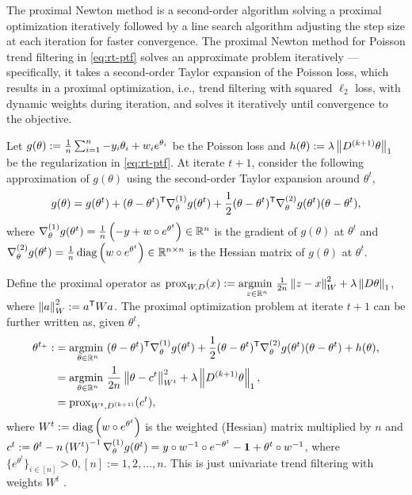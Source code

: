 The proximal Newton method is a second-order algorithm solving a proximal optimization iteratively followed by a line search algorithm adjusting the step size at each iteration for faster convergence. The proximal Newton method for Poisson trend filtering in \eqref{eq:rt-ptf} solves an approximate problem iteratively --- specifically, it takes a second-order Taylor expansion of the Poisson loss, which results in a proximal optimization, i.e., trend filtering with squared $\ell_2$ loss, with dynamic weights during iteration, and solves it iteratively until convergence to the objective. 

Let $g(\theta):= \frac{1}{n} \sum_{i=1}^n -y_i\theta_i + w_i e^{\theta_i}$ be the Poisson loss and $h(\theta) := \lambda \left\lVert D^{(k+1)} \theta \right\rVert_1$ be the regularization in \eqref{eq:rt-ptf}. At iterate $t+1$, consider the following approximation of $g(\theta)$ using the second-order Taylor expansion around $\theta^t$, 
$$ g(\theta) = g(\theta^t) + (\theta - \theta^t)^{\mathsf{T}} \nabla^{(1)}_{\theta} g(\theta^t) + \frac{1}{2} (\theta - \theta^t)^{\mathsf{T}} \nabla^{(2)}_{\theta} g(\theta^t) (\theta - \theta^t), $$
where $\nabla^{(1)}_{\theta} g(\theta^t) = \frac{1}{n} \left(-y + w\circ e^{\theta^t}\right) \in \mathbb{R}^n$ is the gradient of $g(\theta)$ at $\theta^t$ and $\nabla^{(2)}_{\theta} g(\theta^t) = \frac{1}{n}\operatorname*{diag} \left(w \circ e^{\theta^t}\right) \in \mathbb{R}^{n\times n}$ is the Hessian matrix of $g(\theta)$ at $\theta^t$. %

Define the proximal operator as $\mathrm{prox}_{W,D} (x) := \underset{z\in\mathbb{R}^n}{\operatorname*{argmin}\ } \frac{1}{2n} \left\lVert z-x \right\rVert_W^2 + \lambda \left\lVert D\theta \right\rVert_1$, where $\left\lVert a \right\rVert_{W}^2 := a^{\mathsf{T}} {W} a$. The proximal optimization problem at iterate $t+1$ can be further written as, given $\theta^t$,
\begin{equation} \label{eq:prox-gauss}
    \begin{split}
        \theta^{t_+} :&= \underset{\theta\in\mathbb{R}^n}{\operatorname*{argmin}\ } (\theta - \theta^t)^{\mathsf{T}} \nabla^{(1)}_{\theta} g(\theta^t) + \frac{1}{2} (\theta - \theta^t)^{\mathsf{T}} \nabla^{(2)}_{\theta} g(\theta^t) (\theta - \theta^t) + h(\theta), \\
        &= \underset{\theta\in\mathbb{R}^n}{\operatorname*{argmin}\ } \frac{1}{2n} \left\lVert \theta - c^{t} \right\rVert_{W^t}^2 + \lambda \left\lVert D^{(k+1)}\theta \right\rVert_1, \\
        &= \mathrm{prox}_{W^t,D^{(k+1)}} (c^{t}),
    \end{split}
\end{equation}
where $W^t := \operatorname*{diag} \left(w\circ e^{\theta^t}\right)$ is the weighted (Hessian) matrix multiplied by $n$ and ${c^t} := \theta^t - n \left(W^{t}\right)^{-1} \nabla^{(1)}_{\theta} g(\theta^t) = y\circ w^{-1}\circ e^{-\theta^t} - \boldsymbol{1} + \theta^t\circ w^{-1}$, where $\{e^{\theta^t}\}_{i\in[n]} > 0, [n]:=1,2,\dots,n$.
This is just univariate trend filtering with weights $W^t$ \citep{tibshirani2014adaptive}. 

